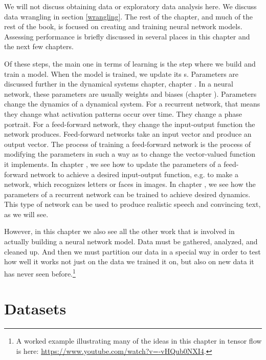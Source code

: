 We will not discuss obtaining data or exploratory data analysis here. We discuss data wrangling in section \ref{wrangling}. The rest of the chapter, and much of the rest of the book, is focused on creating and training neural network models. Assessing performance is briefly discussed in several places in this chapter and the next few chapters.

Of these steps, the main one in terms of learning is the step where we build and train a model. When the model is trained, we update its s. Parameters are discussed further in the dynamical systems chapter, chapter . In a neural network, these parameters are usually weights and biases (chapter ). Parameters change the dynamics of a dynamical system. For a recurrent network, that means they change what activation patterns occur over time. They change a phase portrait. For a feed-forward network, they change the input-output function the network produces. Feed-forward networks take an input vector and produce an output vector. The process of training a feed-forward network is the process of modifying the parameters in such  a way as to change the vector-valued function it implements. In chapter , we see how to update the parameters of a feed-forward network to achieve a desired input-output function, e.g. to make a network, which recognizes letters or faces in images. In chapter , we see how the parameters of a recurrent network can be trained to achieve desired dynamics. This type of network can be used to produce realistic speech and convincing text, as we will see.

However, in this chapter we also see all the other work that is involved in actually building a neural network model. Data must be gathered, analyzed, and cleaned up. And then we must partition our data in a special way in order to test how well it works not just on the data we trained it on, but also on new data it has never seen before.\footnote{A worked example illustrating many of the ideas in this chapter in tensor flow is here: \url{https://www.youtube.com/watch?v=-vHQub0NXI4}.}

\section{Datasets}

